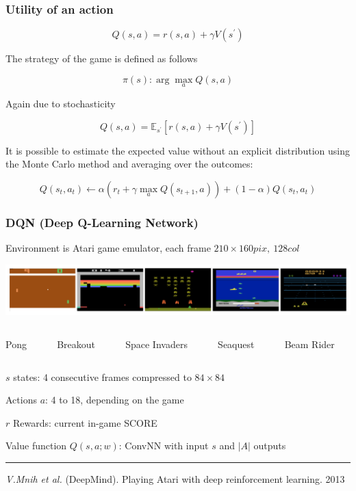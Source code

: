 \documentclass[fullscreen=true, bookmarks=true, hyperref={pdfencoding=unicode}]{beamer}
\begin{document}
\begin{frame}
  \frametitle{Utility of an action}

    $$Q(s, a) = r(s, a) + \gamma V(s^\prime)$$

    The strategy of the game is defined as follows

    $$\pi(s) : \arg\max\limits_a Q(s, a)$$

    \pause
    Again due to stochasticity

    $$Q(s, a) = \mathbb{E}_{s^\prime} [r(s, a) + \gamma V(s^\prime)]$$

    It is possible to estimate the expected value without an explicit distribution using the Monte Carlo method and averaging over the outcomes:

    $$Q(s_t, a_t) \leftarrow \alpha \left(r_t+\gamma \max\limits_a Q(s_{t+1}, a) \right)
    + (1-\alpha) Q(s_{t}, a_{t})$$
\end{frame}


\begin{frame}
  \frametitle{DQN (Deep Q-Learning Network)}

  Environment is Atari game emulator, each frame $210\times 160pix, \ 128col$
  \begin{center}
     \includegraphics[keepaspectratio,
                      width=.85\paperwidth]{atari_games.png}
  \begin{columns}
      \begin{column}{.18\paperwidth}
      Pong
      \end{column}
      \begin{column}{.18\paperwidth}
      Breakout
      \end{column}
      \begin{column}{.18\paperwidth}
      Space Invaders
      \end{column}
      \begin{column}{.18\paperwidth}
      Seaquest
      \end{column}
      \begin{column}{.18\paperwidth}
      Beam Rider
      \end{column}
  \end{columns}
\end{center}
   
   \pause
   $s$ states: 4 consecutive frames compressed to $84 \times 84$

   Actions $a$: 4 to 18, depending on the game

   $r$ Rewards: current in-game SCORE

   Value function $Q(s, a; w)$: ConvNN with input $s$ and $|A|$ outputs

  \vspace{1cm}
  \noindent\rule{8cm}{0.4pt}

  {\footnotesize
  {\it V.Mnih et al.} (DeepMind). Playing Atari with deep reinforcement learning. 2013}
\end{frame}
\end{document}
